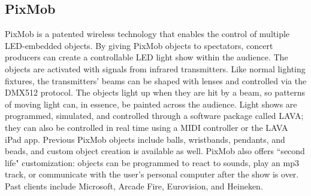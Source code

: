 \subsection{PixMob}

PixMob is a patented wireless technology that enables the control of multiple LED-embedded objects. By giving PixMob objects to spectators, concert producers can create a controllable LED light show within the audience. The objects are activated with signals from infrared transmitters. Like normal lighting fixtures, the transmitters' beams can be shaped with lenses and controlled via the DMX512 protocol. The objects light up when they are hit by a beam, so patterns of moving light can, in essence, be painted across the audience. Light shows are programmed, simulated, and controlled through a software package called LAVA; they can also be controlled in real time using a MIDI controller or the LAVA iPad app. Previous PixMob objects include balls, wristbands, pendants, and beads, and custom object creation is available as well. PixMob also offers ``second life" customization: objects can be programmed to react to sounds, play an mp3 track, or communicate with the user's personal computer after the show is over. Past clients include Microsoft, Arcade Fire, Eurovision, and Heineken.